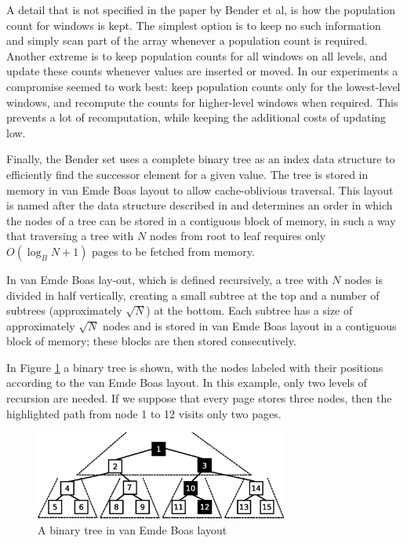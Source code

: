 \documentclass{acm_proc_article-sp}
\begin{document}
A detail that is not specified in the paper by Bender et al, is how the
population count for windows is kept. The simplest option is to keep no such
information and simply scan part of the array whenever a population count is
required. Another extreme is to keep population counts for all windows on all
levels, and update these counts whenever values are inserted or moved. In
our experiments a compromise seemed to work best: keep population counts only
for the lowest-level windows, and recompute the counts for higher-level windows
when required. This prevents a lot of recomputation, while keeping the additional
costs of updating low.

Finally, the Bender set uses a complete binary tree as an index data structure
to efficiently find the successor element for a given value. The tree is
stored in memory in van Emde Boas layout to allow cache-oblivious
traversal. This layout is named after the data structure described in
\cite{vanemdeboas1976dai} and determines an order in which the nodes of a
tree can be stored in a contiguous block of memory, in such a way that traversing
a tree with $N$ nodes from root to leaf requires only $O(\log_B N + 1)$ pages to be
fetched from memory.

In van Emde Boas lay-out, which is defined recursively, a tree with 
$N$ nodes is divided in half vertically, creating a small subtree at the
top and a number of subtrees (approximately $\sqrt{N}$) at the bottom.
Each subtree has a size of approximately $\sqrt{N}$ nodes and is stored in
van Emde Boas layout in a contiguous block of memory; these blocks are then
stored consecutively.

In Figure \ref{fig-van-emde-boas} a binary tree is shown, with the nodes
labeled with their positions according to the van Emde Boas layout.
In this example, only two levels of recursion are needed. If we suppose that
every page stores three nodes, then the highlighted path from node 1 to 12
visits only two pages.

\begin{figure}
\centering
\includegraphics[width=83mm]{vanemdeboas}
\caption{A binary tree in van Emde Boas layout}
\label{fig-van-emde-boas}
\end{figure}
\end{document}
